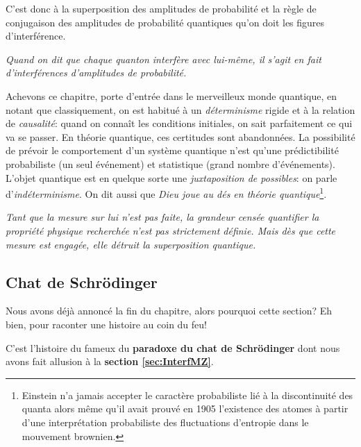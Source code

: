 \begin{enumerate}
C'est donc à la superposition des amplitudes de probabilité et la règle de
conjugaison des amplitudes de probabilité quantiques qu'on doit les figures
d'interférence.

\medskip\colorbox[gray]{0.8}{
\parbox[c]{0.9\textwidth}{
\emph{Quand on dit que chaque quanton interfère avec lui-même, il
s'agit en fait d'interférences d'amplitudes de probabilité.}
}}
\end{enumerate}

Achevons ce chapitre, porte d'entrée dans le merveilleux monde quantique, en
notant que classiquement, on est habitué à un \emph{déterminisme} rigide et à la
relation de \emph{causalité}: quand on connaît les conditions initiales, on sait
parfaitement ce qui va se passer. En théorie quantique, ces certitudes sont
abandonnées. La possibilité de prévoir le comportement d'un système quantique
n'est qu'une prédictibilité probabiliste (un seul événement) et statistique
(grand nombre d'événements). L'objet quantique est en quelque sorte une
\emph{juxtaposition de possibles}: on parle d'\emph{indéterminisme}. On dit
aussi que \emph{Dieu joue au dés en théorie quantique}\footnote{Einstein n'a
jamais accepter le caractère probabiliste lié à la discontinuité des quanta
alors même qu'il avait prouvé en 1905 l'existence des atomes à partir d'une
interprétation probabiliste des fluctuations d'entropie dans le mouvement
brownien.}.

\medskip
\colorbox[gray]{0.8}{
\parbox[c]{0.9\textwidth}{
\emph{Tant que la mesure sur lui n'est pas faite, la grandeur censée quantifier
la propriété physique recherchée n'est pas strictement définie. Mais dès que
cette mesure est engagée, elle détruit la superposition quantique.}
}}

\subsection{Chat de Schrödinger}
\label{sec:EtatSuper}

Nous avons déjà annoncé la fin du chapitre, alors pourquoi cette section? Eh
bien, pour raconter une histoire au coin du feu!

C'est l'histoire du fameux du \textbf{paradoxe du chat de Schrödinger} dont
nous avons fait allusion à la \textbf{section \ref{sec:InterfMZ}}.

